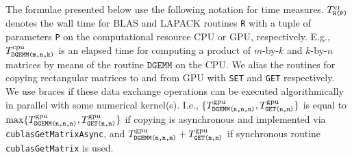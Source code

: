 \documentclass{llncs}
\newcommand{\Lapack}{{\sc LAPACK}\xspace}
\begin{document}
The formulae presented below use the following notation for time measures.
$T^{\rm cr}_{\texttt{R(P)}}$ denotes the wall time 
for BLAS and \Lapack routines {\tt R} with a tuple of parameters {\tt P}
on the computational resource CPU or GPU, respectively.
E.g., $T^{\rm cpu}_{\texttt{DGEMM(m,n,k)}}$ is an elapsed time for 
computing a product of $m$-by-$k$ and $k$-by-$n$ matrices
by means of the routine $\texttt{DGEMM}$ on the CPU.
We alias the routines for copying rectangular matrices to and from GPU 
with {\tt SET} and {\tt GET} respectively.
We use braces if 
these data exchange operations can be executed algorithmically 
in parallel with some numerical kernel(s).
I.e., $\{T_{\texttt{DGEMM(n,n,n)}}^{\rm gpu},T^{\rm gpu}_{\texttt{GET(n,n)}}\}$ 
is equal to 
$\max\{T_{\texttt{DGEMM(n,n,n)}}^{\rm gpu},T^{\rm gpu}_{\texttt{GET(n,n)}}\}$ 
if copying is asynchronous and implemented 
via {\tt cublasGetMatrixAsync}, 
and $T_{\texttt{DGEMM(n,n,n)}}^{\rm gpu}+T^{\rm gpu}_{\texttt{GET(n,n)}}$ 
if synchronous routine {\tt cublasGetMatrix} is used.
\end{document}
